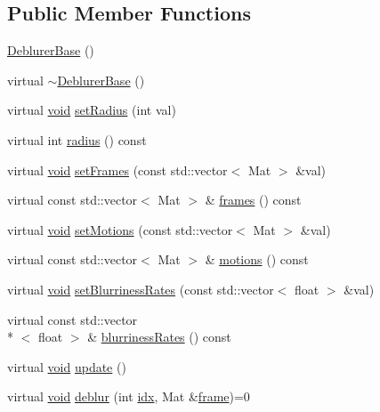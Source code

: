 \subsection*{Public Member Functions}
\begin{DoxyCompactItemize}
\item 
\hyperlink{classcv_1_1videostab_1_1DeblurerBase_ae02367fc462a4caabcb56bafbd5bcc11}{Deblurer\-Base} ()
\item 
virtual \hyperlink{classcv_1_1videostab_1_1DeblurerBase_aa3b7e67a2d82b69b0a069a16b6b8f30f}{$\sim$\-Deblurer\-Base} ()
\item 
virtual \hyperlink{legacy_8hpp_a8bb47f092d473522721002c86c13b94e}{void} \hyperlink{classcv_1_1videostab_1_1DeblurerBase_aff114dc78cdafd537d14879de31ef16e}{set\-Radius} (int val)
\item 
virtual int \hyperlink{classcv_1_1videostab_1_1DeblurerBase_aa2145c211a61762b56e95f595f8c2f16}{radius} () const 
\item 
virtual \hyperlink{legacy_8hpp_a8bb47f092d473522721002c86c13b94e}{void} \hyperlink{classcv_1_1videostab_1_1DeblurerBase_a2449d268c8bd111c6250175c5bcca77d}{set\-Frames} (const std\-::vector$<$ Mat $>$ \&val)
\item 
virtual const std\-::vector$<$ Mat $>$ \& \hyperlink{classcv_1_1videostab_1_1DeblurerBase_a3b77713febe5c666831613ac5a89eefe}{frames} () const 
\item 
virtual \hyperlink{legacy_8hpp_a8bb47f092d473522721002c86c13b94e}{void} \hyperlink{classcv_1_1videostab_1_1DeblurerBase_ada073eb8634a26003e1b63a784bda641}{set\-Motions} (const std\-::vector$<$ Mat $>$ \&val)
\item 
virtual const std\-::vector$<$ Mat $>$ \& \hyperlink{classcv_1_1videostab_1_1DeblurerBase_abb733587049be29e955951a54682b076}{motions} () const 
\item 
virtual \hyperlink{legacy_8hpp_a8bb47f092d473522721002c86c13b94e}{void} \hyperlink{classcv_1_1videostab_1_1DeblurerBase_a79a9a2c76a22405a727fbb2b9c22bf22}{set\-Blurriness\-Rates} (const std\-::vector$<$ float $>$ \&val)
\item 
virtual const std\-::vector\\*
$<$ float $>$ \& \hyperlink{classcv_1_1videostab_1_1DeblurerBase_adfd291bc7f60c85479fcaa7d6f822e11}{blurriness\-Rates} () const 
\item 
virtual \hyperlink{legacy_8hpp_a8bb47f092d473522721002c86c13b94e}{void} \hyperlink{classcv_1_1videostab_1_1DeblurerBase_a56e526f22bdafa2557db6bedc67d0580}{update} ()
\item 
virtual \hyperlink{legacy_8hpp_a8bb47f092d473522721002c86c13b94e}{void} \hyperlink{classcv_1_1videostab_1_1DeblurerBase_a5892088e5543163d6d6f18467d200f32}{deblur} (int \hyperlink{core__c_8h_a5c7c842f447336aa2f10826df65a28b3}{idx}, Mat \&\hyperlink{core__c_8h_a0430deaafd9043e478f306e33961299d}{frame})=0
\end{DoxyCompactItemize}
